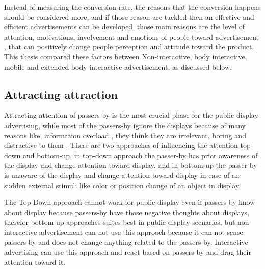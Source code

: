 Instead of measuring the conversion-rate, the reasons that the conversion happens should be considered more, and if those reason are tackled then an effective and efficient advertisements can be developed, those main reasons are the level of attention, motivations, involvement and emotions of people toward advertisement \cite{pervasiv_ad}, that can positively change people perception and attitude toward the product. This thesis compared these factors between Non-interactive, body interactive, mobile and extended body interactive advertisement, as discussed below.

\subsection{Attracting attraction}
Attracting attention of passers-by is the most crucial phase for the public display advertising, while most of the passers-by ignore the displays because of many reasons like, information overload \cite{Information_overload}, they think they are irrelevant, boring and distractive to them \cite{banner_blindness, display_blindness}. There are two approaches of influencing the attention top-down and bottom-up, in top-down approach the passer-by has prior awareness of the display and change attention toward display, and in bottom-up the passer-by is unaware of the display and change attention toward display in case of an sudden external stimuli like color \cite{Luminance} or position \cite{capturingattention} change of an object in display.  

The Top-Down approach cannot work for public display even if passers-by know about display because passers-by have those negative thoughts about displays, therefor bottom-up approaches suites best in public display scenarios, but non-interactive advertisement can not use this approach because it can not sense passers-by and does not change anything related to the passers-by. Interactive advertising can use this approach and react based on passers-by and drag their attention toward it.



